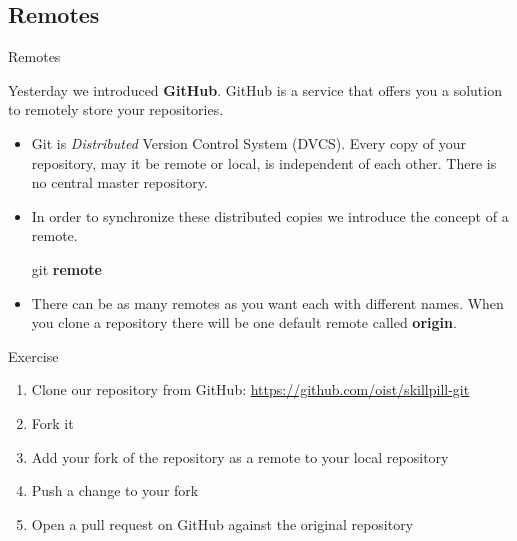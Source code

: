 \documentclass{beamer}
\begin{document}
\subsection{Remotes}
\begin{frame}[fragile]{Remotes}

Yesterday we introduced \textbf{GitHub}. GitHub is a service that offers you a solution to remotely store your repositories.
\begin{itemize}
    \item Git is \emph{Distributed} Version Control System (DVCS). Every copy of your repository, may it be remote or local, is independent of each other. There is no central master repository. 

    \item In order to synchronize these distributed copies we introduce the concept of a remote.
\pause
  \begin{block}{}
    git \textbf{remote}
  \end{block}
\pause
  \item There can be as many remotes as you want each with different names. When you clone a repository there will be one default remote called \textbf{origin}.
\end{itemize}
\end{frame}
\begin{frame}
  \begin{block}{Exercise}
    \begin{enumerate}
      \item Clone our repository from GitHub: \url{https://github.com/oist/skillpill-git}
      \item Fork it
      \item Add your fork of the repository as a remote to your local repository
      \item Push a change to your fork
      \item Open a pull request on GitHub against the original repository
    \end{enumerate}
  \end{block}
\end{frame}
\end{document}
